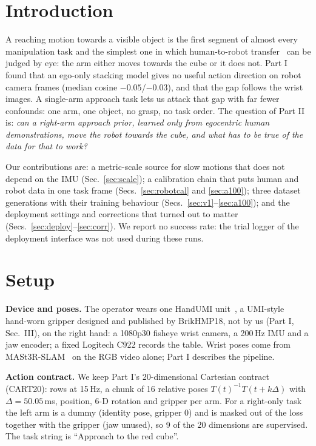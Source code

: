 \documentclass[conference,10pt]{IEEEtran}
\begin{document}
\section{Introduction}\label{sec:intro}
A reaching motion towards a visible object is the first segment of almost every manipulation task and the simplest one in which human-to-robot transfer~\cite{kareer2024egomimic} can be judged by eye: the arm either moves towards the cube or it does not. Part I found that an
ego-only stacking model gives no useful action direction on robot camera frames (median cosine $-0.05$/$-0.03$), and that the
gap follows the wrist images. A single-arm approach task lets us attack that gap with far fewer confounds: one arm, one object,
no grasp, no task order. The question of Part II is: \emph{can a right-arm approach prior, learned only from egocentric human
demonstrations, move the robot towards the cube, and what has to be true of the data for that to work?}

Our contributions are: a metric-scale source for slow motions that does not depend on the IMU (Sec.~\ref{sec:scale}); a
calibration chain that puts human and robot data in one task frame (Secs.~\ref{sec:robotcal} and \ref{sec:a100}); three
dataset generations with their training behaviour (Secs.~\ref{sec:v1}--\ref{sec:a100}); and the deployment settings and
corrections that turned out to matter (Secs.~\ref{sec:deploy}--\ref{sec:corr}). We report no success rate: the trial logger
of the deployment interface was not used during these runs.

\section{Setup}\label{sec:setup}
\textbf{Device and poses.} The operator wears one HandUMI unit~\cite{handumi_hw}, a UMI-style~\cite{chi2024umi} hand-worn gripper designed and published by BrikHMP18, not by us (Part I, Sec.~III), on the right hand: a 1080p30 fisheye wrist
camera, a 200\,Hz IMU and a jaw encoder; a fixed Logitech C922 records the table. Wrist poses come from MASt3R-SLAM~\cite{murai2025mast3rslam} on the RGB
video alone; Part I describes the pipeline.

\textbf{Action contract.} We keep Part I's 20-dimensional Cartesian contract (CART20): rows at 15\,Hz, a chunk of 16 relative
poses $T(t)^{-1}T(t+k\Delta)$ with $\Delta=50.05$\,ms, position, 6-D rotation and gripper per arm. For a right-only task the
left arm is a dummy (identity pose, gripper 0) and is masked out of the loss together with the gripper (jaw unused), so 9 of the
20 dimensions are supervised. The task string is ``Approach to the red cube''.
\end{document}
